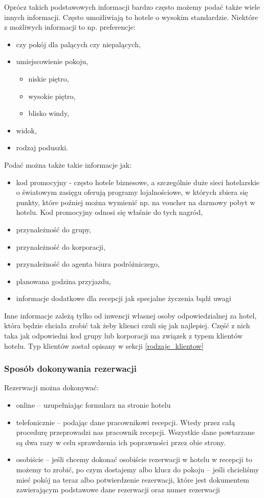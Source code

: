 \documentclass[12pt, a4paper]{article}
\begin{document}
Oprócz takich podstawowych informacji bardzo często możemy podać także wiele 
innych informacji. Często umożliwiają to hotele o wysokim standardzie. Niektóre
z możliwych informacji to np. preferencje:
\begin{itemize}
  \item czy pokój dla palących czy niepalących,
  \item umiejscowienie pokoju,
  \begin{itemize}
    \item niskie piętro,
    \item wysokie piętro,
    \item blisko windy,
  \end{itemize}
  \item widok,
  \item rodzaj poduszki.
\end{itemize}

Podać można także takie informacje jak:
\begin{itemize}
  \item kod promocyjny - często hotele biznesowe, a szczególnie duże sieci
  hotelarskie o światowym zasięgu oferują programy lojalnościowe, w których
  zbiera się punkty, które poźniej można wymienić np. na voucher na darmowy
  pobyt w hotelu. Kod promocyjny odnosi się właśnie do tych nagród,
  \item przynależność do grupy,
  \item przynależność do korporacji,
  \item przynależność do agenta biura podróżniczego,
  \item planowana godzina przyjazdu,
  \item informacje dodatkowe dla recepcji jak specjalne życzenia bądź uwagi
\end{itemize}

Inne informacje zależą tylko od inwencji własnej osoby odpowiedzialnej za hotel,
która będzie chciała zrobić tak żeby klienci czuli się jak najlepiej. Część z nich 
taka jak odpowiedni kod grupy lub korporacji ma związek z typem klientów hotelu.
Typ klientów został opisany w sekcji \ref{rodzaje_klientow}

\subsubsection{Sposób dokonywania rezerwacji}
Rezerwacji można dokonywać:
\begin{itemize}
  \item online – uzupełniając formularz na stronie hotelu
  \item telefonicznie – podając dane pracownikowi recepcji. Wtedy przez 
  całą procedurę przeprowadzi nas pracownik recepcji. Wszystkie dane powtarzane
  są dwa razy w celu sprawdzenia ich poprawności przez obie strony.
  \item osobiście – jeśli chcemy dokonać osobiście rezerwacji w hotelu w
  recepcji to możemy to zrobić, po czym dostajemy albo klucz do 
  pokoju – jeśli chcieliśmy mieć pokój na teraz albo potwierdzenie rezerwacji, 
  które jest dokumentem zawierającym podstawowe dane rezerwacji oraz 
  numer rezerwacji
\end{itemize}
\end{document}
